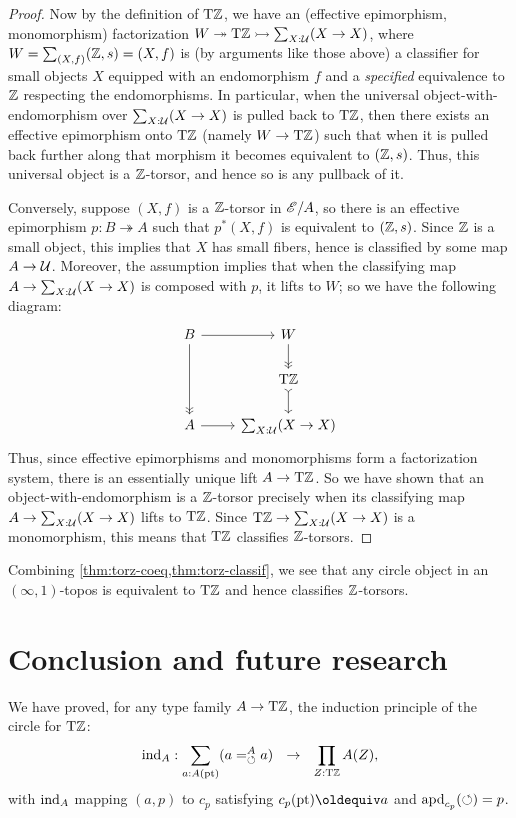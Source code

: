 \documentclass[a4paper,12pt]{amsart}
\begin{document}
\begin{proof}
Now by the definition of ${\mathrm{T}\mathbb{Z}}$, we have an (effective epimorphism, monomorphism) factorization $W \twoheadrightarrow {\mathrm{T}\mathbb{Z}} \rightarrowtail \sum_{X:\mathcal{U}} (X\to X)$, where $W = \sum_{(X,f)} (\mathbb{Z},s)=(X,f)$ is (by arguments like those above) a classifier for small objects $X$ equipped with an endomorphism $f$ and a \emph{specified} equivalence to $\mathbb{Z}$ respecting the endomorphisms.
In particular, when the universal object-with-endomorphism over $\sum_{X:\mathcal{U}} (X\to X)$ is pulled back to ${\mathrm{T}\mathbb{Z}}$, then there exists an effective epimorphism onto ${\mathrm{T}\mathbb{Z}}$ (namely $W\to {\mathrm{T}\mathbb{Z}}$) such that when it is pulled back further along that morphism it becomes equivalent to $(\mathbb{Z},s)$.
Thus, this universal object is a $\mathbb{Z}$-torsor, and hence so is any pullback of it.

Conversely, suppose $(X,f)$ is a $\mathbb{Z}$-torsor in $\mathscr{E}/A$, so there is an effective epimorphism $p:B\twoheadrightarrow A$ such that $p^*(X,f)$ is equivalent to $(\mathbb{Z},s)$.
Since $\mathbb{Z}$ is a small object, this implies that $X$ has small fibers, hence is classified by some map $A\to \mathcal{U}$.
Moreover, the assumption implies that when the classifying map $A\to \sum_{X:\mathcal{U}} (X\to X)$ is composed with $p$, it lifts to $W$; so we have the following diagram:
\[
\begin{tikzcd}
  B \ar[dd,->>] \ar[r] & W \ar[d,->>] \\
  & \TorZ \ar[d,>->] \\
  A \ar[r] & \sum_{X:\UU} (X\to X)
\end{tikzcd}
\]
Thus, since effective epimorphisms and monomorphisms form a factorization system, there is an essentially unique lift $A\to {\mathrm{T}\mathbb{Z}}$.
So we have shown that an object-with-endomorphism is a $\mathbb{Z}$-torsor precisely when its classifying map $A\to \sum_{X:\mathcal{U}} (X\to X)$ lifts to ${\mathrm{T}\mathbb{Z}}$.
Since ${\mathrm{T}\mathbb{Z}} \to \sum_{X:\mathcal{U}} (X\to X)$ is a monomorphism, this means that ${\mathrm{T}\mathbb{Z}}$ classifies $\mathbb{Z}$-torsors.
\end{proof}

Combining \cref{thm:torz-coeq,thm:torz-classif}, we see that any circle object in an $(\infty,1)$-topos is equivalent to ${\mathrm{T}\mathbb{Z}}$ and hence classifies $\mathbb{Z}$-torsors.


\section{Conclusion and future research}
\label{sec:conclusion}

We have proved, {for any type family $A\to{\mathrm{T}\mathbb{Z}}$,}
the induction principle of the circle for ${\mathrm{T}\mathbb{Z}}$:
\[
{\mathop{\mathrm{ind}}}_A : \sum_{a:A({\mathord{\mathrm{pt}}})}(a=^A_{\circlearrowleft} a) ~~\to~~ \prod_{Z:{\mathrm{T}\mathbb{Z}}} A(Z),
\]
with ${\mathop{\mathrm{ind}}}_A$ mapping $(a,p)$ to $c_p$ satisfying $c_p(\pt) \jdeq a$
and $\mathop{{\mathrm{apd}}_{c_p}}({\circlearrowleft}) = p$.
\end{document}
